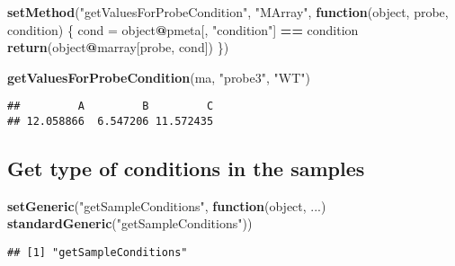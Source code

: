 \documentclass[]{article}
\newenvironment{Shaded}{\begin{snugshade}}{\end{snugshade}}
\newcommand{\ControlFlowTok}[1]{\textcolor[rgb]{0.13,0.29,0.53}{\textbf{#1}}}
\newcommand{\KeywordTok}[1]{\textcolor[rgb]{0.13,0.29,0.53}{\textbf{#1}}}
\newcommand{\NormalTok}[1]{#1}
\newcommand{\OperatorTok}[1]{\textcolor[rgb]{0.81,0.36,0.00}{\textbf{#1}}}
\newcommand{\StringTok}[1]{\textcolor[rgb]{0.31,0.60,0.02}{#1}}
\begin{document}
\begin{Shaded}
\begin{Highlighting}[]
\KeywordTok{setMethod}\NormalTok{(}\StringTok{"getValuesForProbeCondition"}\NormalTok{, }\StringTok{"MArray"}\NormalTok{,}
          \ControlFlowTok{function}\NormalTok{(object, probe, condition) \{}
\NormalTok{              cond =}\StringTok{ }\NormalTok{object}\OperatorTok{@}\NormalTok{pmeta[, }\StringTok{"condition"}\NormalTok{] }\OperatorTok{==}\StringTok{ }\NormalTok{condition}
              \KeywordTok{return}\NormalTok{(object}\OperatorTok{@}\NormalTok{marray[probe, cond])}
\NormalTok{          \})}
\end{Highlighting}
\end{Shaded}

\begin{Shaded}
\begin{Highlighting}[]
\KeywordTok{getValuesForProbeCondition}\NormalTok{(ma, }\StringTok{"probe3"}\NormalTok{, }\StringTok{"WT"}\NormalTok{)}
\end{Highlighting}
\end{Shaded}

\begin{verbatim}
##         A         B         C 
## 12.058866  6.547206 11.572435
\end{verbatim}

\hypertarget{get-type-of-conditions-in-the-samples}{%
\subsection{Get type of conditions in the
samples}\label{get-type-of-conditions-in-the-samples}}

\begin{Shaded}
\begin{Highlighting}[]
\KeywordTok{setGeneric}\NormalTok{(}\StringTok{"getSampleConditions"}\NormalTok{, }\ControlFlowTok{function}\NormalTok{(object, ...) }
    \KeywordTok{standardGeneric}\NormalTok{(}\StringTok{"getSampleConditions"}\NormalTok{))}
\end{Highlighting}
\end{Shaded}

\begin{verbatim}
## [1] "getSampleConditions"
\end{verbatim}

\begin{Shaded}
\end{Shaded}
\end{document}
